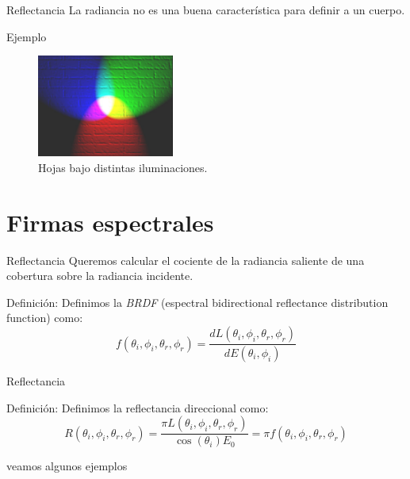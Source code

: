 \documentclass[handout]{beamer}
\begin{document}
\begin{frame}{Reflectancia}
  La radiancia no es una buena característica para definir a un cuerpo.
  \begin{exampleblock}{Ejemplo}
  \begin{figure}
    \includegraphics[width=0.4\textwidth]{imagenes/RGBillumination.png}
    \caption{Hojas bajo distintas iluminaciones.}
  \end{figure}
  \end{exampleblock}

\end{frame}

\section{Firmas espectrales}
\begin{frame}{Reflectancia}
  Queremos calcular el cociente de la radiancia saliente de una cobertura sobre la radiancia incidente. \pause
  \begin{block}{Definición:}
    Definimos la \emph{BRDF} (espectral bidirectional reflectance distribution function) como:
    $$ f(\theta_i, \phi_i, \theta_r, \phi_r) = \frac{dL(\theta_i, \phi_i, \theta_r, \phi_r)}{dE(\theta_i, \phi_i)}$$
  \end{block}
\end{frame}

\begin{frame}{Reflectancia}
  \begin{block}{Definición:}
    Definimos la reflectancia direccional como:
    $$ R(\theta_i, \phi_i, \theta_r, \phi_r) = \frac{\pi L(\theta_i, \phi_i, \theta_r, \phi_r)}{\cos(\theta_i) E_0} = \pi f(\theta_i, \phi_i, \theta_r, \phi_r)$$
  \end{block}
  veamos algunos ejemplos
\end{frame}
\end{document}
